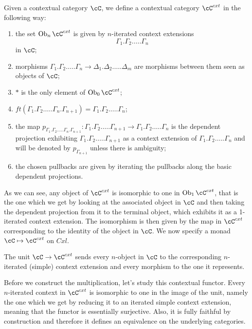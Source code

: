 \begin{construction}
  Given a contextual category $\cC$, we define a contextual category $\cC^{cxt}$
  in the following way:
  \begin{enumerate}
    \item the set $\Ob_n\cC^{cxt}$ is given by $n$-iterated context extensions
      \[\Gamma_1.\Gamma_2.\ldots.\Gamma_n\]
      in $\cC$;
    \item morphisms
      $\Gamma_1.\Gamma_2.\ldots.\Gamma_n\rightarrow\Delta_1.\Delta_2.\ldots.\Delta_m$
      are morphisms between them seen as objects of $\cC$;
    \item $*$ is the only element of $\Ob_0\cC^{cxt}$;
    \item
      $ft(\Gamma_1.\Gamma_2.\ldots.\Gamma_n.\Gamma_{n+1})=\Gamma_1.\Gamma_2.\ldots.\Gamma_n$;
    \item the map $p_{\Gamma_1.\Gamma_2.\ldots.\Gamma_n.\Gamma_{n+1}}\colon
      \Gamma_1.\Gamma_2.\ldots.\Gamma_{n+1}\rightarrow
      \Gamma_1.\Gamma_2.\ldots.\Gamma_n$ is the dependent projection exhibiting
      $\Gamma_1.\Gamma_2.\ldots.\Gamma_{n+1}$ as a context extension of
      $\Gamma_1.\Gamma_2.\ldots.\Gamma_n$ and will be denoted by
      $p_{\Gamma_{n+1}}$ unless there is ambiguity;
    \item the chosen pullbacks are given by iterating the pullbacks along the
      basic dependent projections.
  \end{enumerate}

  As we can see, any object of $\cC^{cxt}$ is isomorphic to one in
  $\Ob_1\cC^{cxt}$, that is the one which we get by looking at the associated object
  in $\cC$ and then taking the dependent projection from it to the terminal
  object, which exhibits it as a 1-iterated context extension. The isomorphism
  is then given by the map in $\cC^{cxt}$ corresponding to the identity of the
  object in $\cC$. We now specify a monad $\cC\mapsto\cC^{cxt}$ on $Cxl$.

  The unit $\cC\rightarrow\cC^{cxt}$ sends every $n$-object in $\cC$ to
  the corresponding $n$-iterated (simple) context extension and every morphism
  to the one it represents.

  Before we construct the multiplication, let's study this contextual functor.
  Every $n$-iterated
  context in $\cC^{cxt}$ is isomorphic to one in the image of the unit, namely
  the one which we get by reducing it to an iterated simple context extension,
  meaning that the functor is essentially surjective. Also, it is fully faithful
  by construction and therefore it defines an equivalence on the underlying
  categories.


\end{construction}
